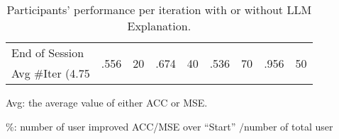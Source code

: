 \begin{table}[t]
\begin{threeparttable}
\begin{tabular}{l|c|c|c|c|c|c|c|c}
        \hline
        \multicolumn{1}{l|}{End of Session} & \multicolumn{1}{c}{\multirow{2}{*}{.556}}& \multicolumn{1}{c}{\multirow{2}{*}{20}}& \multicolumn{1}{c}{\multirow{2}{*}{.674}} & \multicolumn{1}{c}{\multirow{2}{*}{40}} & \multicolumn{1}{c}{\multirow{2}{*}{.536}} & \multicolumn{1}{c}{\multirow{2}{*}{70}} & \multicolumn{1}{c}{\multirow{2}{*}{.956}}& \multicolumn{1}{c}{\multirow{2}{*}{50}}\\
        \multicolumn{1}{l|}{Avg \#Iter (4.75} \\
        \hline
    \end{tabular}
    \begin{tablenotes}
        \tiny
        \item Avg: the average value of either ACC or MSE.
        \item \%: number of user improved ACC/MSE over ``Start'' $/$number of total user
    \end{tablenotes}
    \end{threeparttable}
    \caption{Participants' performance per iteration with or without LLM Explanation.}
    \label{tab:participant-explanation-detail}
\end{table}


        
        



